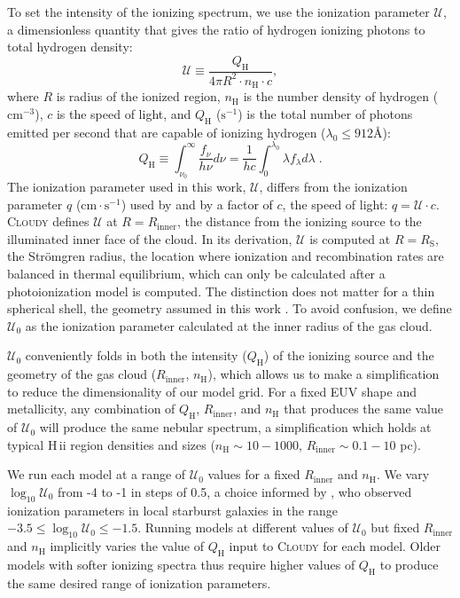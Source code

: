 \documentclass[trackchanges, twocolumn, tighten]{aastex61}
\newcommand{\strom}{Str{\"o}mgren}
\newcommand{\Cloudy}{\textsc{Cloudy}\xspace}
\newcommand{\logten}{\ensuremath{\log_{10}}}
\newcommand{\hii}{H\,{\sc ii}\xspace}
\newcommand{\nH}{\ensuremath{n_{\mathrm{H}}}}
\newcommand{\cm}[1]{\ensuremath{\mathrm{cm}^{#1}}}
\newcommand{\ang}{\ensuremath{\mbox{\AA}}}
\newcommand{\Rin}{\ensuremath{R_{\mathrm{inner}}}}
\newcommand{\QH}{\ensuremath{Q_{\mathrm{H}}}}
\newcommand{\U}{\ensuremath{\mathcal{U}_{0}}}
\newcommand{\Rs}{\ensuremath{R_{\mathrm{S}}}}
\newcommand\s[1]{\ensuremath{\mathrm{s}^{#1}}}
\newcommand\cms{\ensuremath{\mathrm{cm} \cdot \mathrm{s}^{-1}}}
\newcommand{\logU}{\ensuremath{\logten \mathcal{U}_0}}
\begin{document}
To set the intensity of the ionizing spectrum, we use the ionization parameter $\mathcal{U}$, a dimensionless quantity that gives the ratio of hydrogen ionizing photons to total hydrogen density:
\begin{equation}\label{eq:logU}
    \mathcal{U} \equiv \frac{\QH{}}{4 \pi R^2 \cdot \nH \cdot c},
\end{equation}
where $R$ is radius of the ionized region, \nH{} is the number density of hydrogen (\cm{-3}), $c$ is the speed of light, and \QH{} (\s{-1}) is the total number of photons emitted per second that are capable of ionizing hydrogen ($\lambda_0 \leq 912 \ang$):
\begin{equation}\label{eq:Q}
    \QH{} \equiv \int_{\nu_0}^{\infty}\frac{f_{\nu}}{h \nu} d\nu = \frac{1}{hc} \int_0^{\lambda_0}\lambda f_{\lambda}d\lambda\;.
\end{equation}
The ionization parameter used in this work, $\mathcal{U}$, differs from the ionization parameter $q$ (\cms) used by \citet{Levesque10} and \citet{Dopita13} by a factor of $c$, the speed of light: $q = \mathcal{U} \cdot c$. \Cloudy defines $\mathcal{U}$ at $R = \Rin$, the distance from the ionizing source to the illuminated inner face of the cloud. In its derivation, $\mathcal{U}$ is computed at $R = \Rs$, the \strom{} radius, the location where ionization and recombination rates are balanced in thermal equilibrium, which can only be calculated after a photoionization model is computed. The distinction does not matter for a thin spherical shell, the geometry assumed in this work \citep[for details see][]{CL01}. To avoid confusion, we define \U{} as the ionization parameter calculated at the inner radius of the gas cloud.

\U{} conveniently folds in both the intensity (\QH{}) of the ionizing source and the geometry of the gas cloud (\Rin{}, \nH{}), which allows us to make a simplification to reduce the dimensionality of our model grid. For a fixed EUV shape and metallicity, any combination of \QH{}, \Rin{}, and \nH{} that produces the same value of \U{} will produce the same nebular spectrum, a simplification which holds at typical \hii region densities and sizes ($\nH{} \sim 10-1000$, $\Rin \sim 0.1-10$ pc). 

We run each model at a range of \U{} values for a fixed \Rin{} and \nH{}. We vary \logU{} from -4 to -1 in steps of 0.5, a choice informed by \citet{Rigby04}, who observed ionization parameters in local starburst galaxies in the range $-3.5 \leq \logU \leq -1.5$. Running models at different values of \U{} but fixed \Rin{} and \nH{} implicitly varies the value of \QH{} input to \Cloudy for each model. Older models with softer ionizing spectra thus require higher values of \QH{} to produce the same desired range of ionization parameters. 
\end{document}
